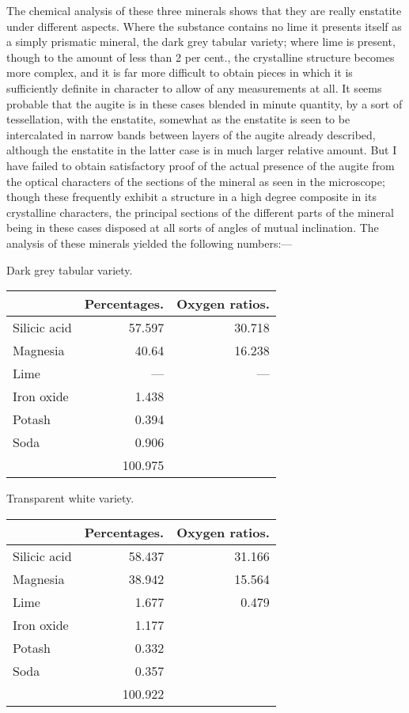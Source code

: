 \documentclass[a4paper, 12pt, oneside]{article}
\begin{document}
The chemical analysis of these three minerals shows that they are really enstatite under different aspects. Where the substance contains no lime it presents itself as a simply prismatic mineral, the dark grey tabular variety; where lime is present, though to the amount of less than 2 per cent., the crystalline structure becomes more complex, and it is far more difficult to obtain pieces in which it is sufficiently definite in character to allow of any measurements at all. It seems probable that the augite is in these cases blended in minute quantity, by a sort of tessellation, with the enstatite, somewhat as the enstatite is seen to be intercalated in narrow bands between layers of the augite already described, although the enstatite in the latter case is in much larger relative amount. But I have failed to obtain satisfactory proof of the actual presence of the augite from the optical characters of the sections of the mineral as seen in the microscope; though these frequently exhibit a structure in a high degree composite in its crystalline characters, the principal sections of the different parts of the mineral being in these cases disposed at all sorts of angles of mutual inclination. The analysis of these minerals yielded the following numbers:---
\clearpage
\begin{center}
Dark grey tabular variety.
\end{center}
\begin{table}[H]
    \centering
    \footnotesize
    \begin{tabular}{l r r}
        ~ & Percentages. & Oxygen ratios. \\ \hline
        Silicic acid & 57.597 & 30.718 \\ 
        Magnesia & 40.64 & 16.238 \\ 
        Lime & --- & ---   \\ 
        Iron oxide & 1.438 & ~ \\
        Potash & 0.394 & ~ \\
        Soda & 0.906 & ~ \\ \hline
        ~ & 100.975 & ~ \\
    \end{tabular}
\end{table}
\begin{center}
Transparent white variety. 
\end{center}
\begin{table}[H]
    \centering
    \footnotesize
    \begin{tabular}{l r r}
        ~ & Percentages. & Oxygen ratios. \\ \hline
        Silicic acid & 58.437 & 31.166 \\
        Magnesia & 38.942 & 15.564 \\
        Lime & 1.677 & 0.479 \\
        Iron oxide & 1.177 & ~\\ 
        Potash & 0.332 & ~ \\
        Soda & 0.357 & ~ \\ \hline
        ~ & 100.922 & ~ \\
    \end{tabular}
\end{table}
\end{document}
